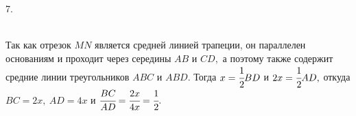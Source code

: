 7. \begin{figure}[ht!]
\end{figure}\\
Так как отрезок $MN$ является средней линией трапеции, он параллелен основаниям и проходит через середины $AB$ и $CD,$ а поэтому также содержит средние линии треугольников $ABC$ и $ABD.$ Тогда $x=\cfrac{1}{2}BD$ и $2x=\cfrac{1}{2}AD,$ откуда $BC=2x,\ AD=4x$ и $\cfrac{BC}{AD}=\cfrac{2x}{4x}=\cfrac{1}{2}.$\\
